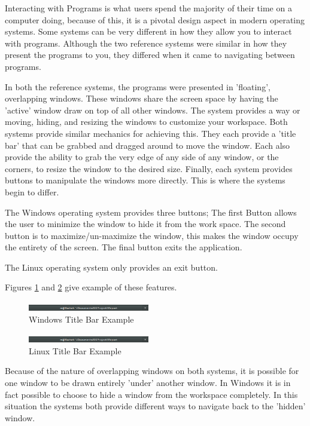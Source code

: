 \documentclass[a4paper]{report}
\begin{document}
Interacting with Programs is what users spend the majority of their time on a computer doing, because of this, it is a pivotal design aspect in modern operating systems. Some systems can be very different in how they allow you to interact with programs. Although the two reference systems were similar in how they present the programs to you, they differed when it came to navigating between programs.

In both the reference systems, the programs were presented in 'floating', overlapping windows. These windows share the screen space by having the 'active' window draw on top of all other windows. The system provides a way or moving, hiding, and resizing the windows to customize your workspace. Both systems provide similar mechanics for achieving this. They each provide a 'title bar' that can be grabbed and dragged around to move the window. Each also provide the ability to grab the very edge of any side of any window, or the corners, to resize the window to the desired size. Finally, each system provides buttons to manipulate the windows more directly. This is where the systems begin to differ.

The Windows operating system provides three buttons; The first Button allows the user to minimize the window to hide it from the work space. The second button is to maximize/un-maximize the window, this makes the window occupy the entirety of the screen. The final button exits the application.

The Linux operating system only provides an exit button.

Figures \ref{fig:WinTitleBarScreen} and \ref{fig:LinTitleBarScreen} give example of these features.

\begin{figure}[ht]
\centering
\includegraphics[width=200px]{images/Linux_title_bar_screenshot}
\caption{Windows Title Bar Example}
\label{fig:WinTitleBarScreen}
\end{figure}

\begin{figure}[ht]
\centering
\includegraphics[width=200px]{images/Linux_title_bar_screenshot}
\caption{Linux Title Bar Example}
\label{fig:LinTitleBarScreen}
\end{figure}

Because of the nature of overlapping windows on both systems, it is possible for one window to be drawn entirely 'under' another window. In Windows it is in fact possible to choose to hide a window from the workspace completely. In this situation the systems both provide different ways to navigate back to the 'hidden' window.
\end{document}

